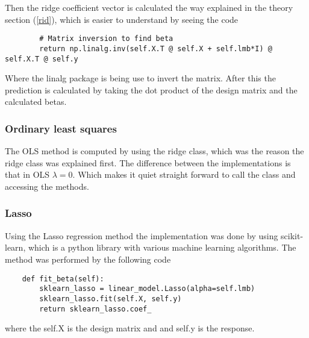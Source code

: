 \documentclass[../main.tex]{subfiles}
\begin{document}
Then the ridge coefficient vector is calculated the way explained in the theory section (\ref{rid}), which is easier to understand by seeing the code
\begin{verbatim}
        # Matrix inversion to find beta
        return np.linalg.inv(self.X.T @ self.X + self.lmb*I) @ self.X.T @ self.y
\end{verbatim}
Where the linalg package is being use to invert the matrix. After this the prediction is calculated by taking the dot product of the design matrix and the calculated betas.

\subsubsection{Ordinary least squares}
The OLS method is computed by using the ridge class, which was the reason the ridge class was explained first. The difference between the implementations is that in OLS $\lambda=0$. Which makes it quiet straight forward to call the class and accessing the methods.

\subsubsection{Lasso}
Using the Lasso regression method the implementation was done by using scikit-learn, which is a python library with various machine learning algorithms. The method was performed by the following code
\begin{verbatim}
    def fit_beta(self):
        sklearn_lasso = linear_model.Lasso(alpha=self.lmb)
        sklearn_lasso.fit(self.X, self.y)
        return sklearn_lasso.coef_
\end{verbatim}
where the self.X is the design matrix and and self.y is the response.
\end{document}
